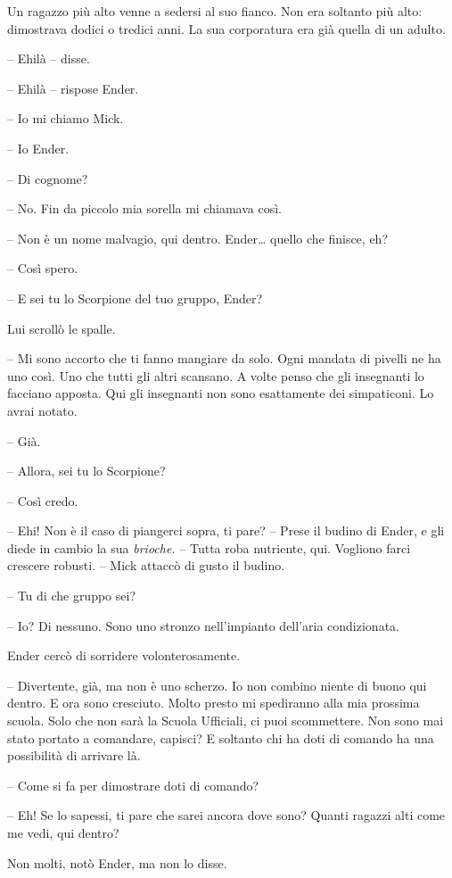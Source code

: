 {Un ragazzo più alto venne a sedersi al suo fianco. Non era soltanto più
	alto: dimostrava dodici o tredici anni. La sua corporatura era già
	quella di un adulto.}

{-- Ehilà -- disse.}

{-- Ehilà -- rispose Ender.}

{-- Io mi chiamo Mick.}

{-- Io Ender.}

{-- Di cognome?}

{-- No. Fin da piccolo mia sorella mi chiamava così.}

{-- Non è un nome malvagio, qui dentro. Ender\ldots{} quello che
	finisce, eh?}

{-- Così spero.}

{-- E sei tu lo Scorpione del tuo gruppo, Ender?}

{Lui scrollò le spalle.}

{-- Mi sono accorto che ti fanno mangiare da solo. Ogni mandata di
	pivelli ne ha uno così. Uno che tutti gli altri scansano. A volte penso
	che gli insegnanti lo facciano apposta. Qui gli insegnanti non sono
	esattamente dei simpaticoni. Lo avrai notato.}

{-- Già.}

{-- Allora, sei tu lo Scorpione?}

{-- Così credo.}

{-- Ehi! Non è il caso di piangerci sopra, ti pare? -- Prese il budino
	di Ender, e gli diede in cambio la sua \emph{brioche.} -- Tutta roba
	nutriente, qui. Vogliono farci crescere robusti. -- Mick attaccò di
	gusto il budino.}

{-- Tu di che gruppo sei?}

{-- Io? Di nessuno. Sono uno stronzo nell'impianto dell'aria
	condizionata.}

{Ender cercò di sorridere volonterosamente.}

{-- Divertente, già, ma non è uno scherzo. Io non combino niente di
	buono qui dentro. E ora sono cresciuto. Molto presto mi spediranno alla
	mia prossima scuola. Solo che non sarà la Scuola Ufficiali, ci puoi
	scommettere. Non sono mai stato portato a comandare, capisci? E soltanto
	chi ha doti di comando ha una possibilità di arrivare là.}

{-- Come si fa per dimostrare doti di comando?}

{-- Eh! Se lo sapessi, ti pare che sarei ancora dove sono? Quanti
	ragazzi alti come me vedi, qui dentro?}

{Non molti, notò Ender, ma non lo disse.}

